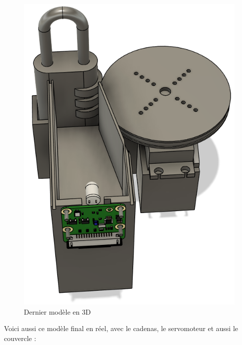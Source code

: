 \documentclass[twoside]{article}
\begin{document}
\begin{multicols}{2}
\begin{figure}[H]
\centering
\includegraphics[scale=0.4]{lastModel.png}
\caption{Dernier modèle en 3D}
\end{figure}

Voici aussi ce modèle final en réel, avec le cadenas, le servomoteur et aussi le couvercle : 


\end{multicols}
\end{document}
